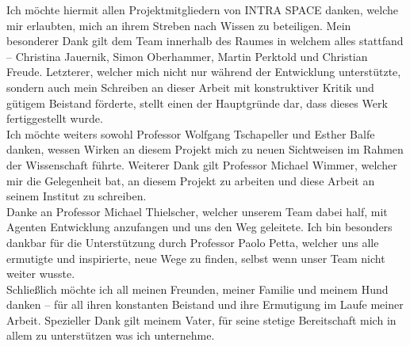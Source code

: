 \documentclass[draft,final]{vutinfth} %
\begin{document}
\frontmatter %

\glsunsetall


\glsresetall

\addstatementpage

\begin{danksagung*}

Ich möchte hiermit allen Projektmitgliedern von INTRA SPACE danken, welche mir erlaubten, mich an ihrem Streben nach Wissen zu beteiligen.
Mein besonderer Dank gilt dem Team innerhalb des Raumes in welchem alles stattfand – Christina Jauernik, Simon Oberhammer, Martin Perktold und Christian Freude. 
Letzterer, welcher mich nicht nur während der Entwicklung unterstützte, sondern auch mein Schreiben an dieser Arbeit mit konstruktiver Kritik und gütigem Beistand förderte, stellt einen der Hauptgründe dar, dass dieses Werk fertiggestellt wurde. \\
Ich möchte weiters sowohl Professor Wolfgang Tschapeller und Esther Balfe danken, wessen Wirken an diesem Projekt mich zu neuen Sichtweisen im Rahmen der Wissenschaft führte. 
Weiterer Dank gilt Professor Michael Wimmer, welcher mir die Gelegenheit bat, an diesem Projekt zu arbeiten und diese Arbeit an seinem Institut zu schreiben. \\
Danke an Professor Michael Thielscher, welcher unserem Team dabei half, mit Agenten Entwicklung anzufangen und uns den Weg geleitete. 
Ich bin besonders dankbar für die Unterstützung durch Professor Paolo Petta, welcher uns alle ermutigte und inspirierte, neue Wege zu finden, selbst wenn unser Team nicht weiter wusste. \\
Schließlich möchte ich all meinen Freunden, meiner Familie und meinem Hund danken – für all ihren konstanten Beistand und ihre Ermutigung im Laufe meiner Arbeit.
Spezieller Dank gilt meinem Vater, für seine stetige Bereitschaft mich in allem zu unterstützen was ich unternehme.

\end{danksagung*}
\end{document}
